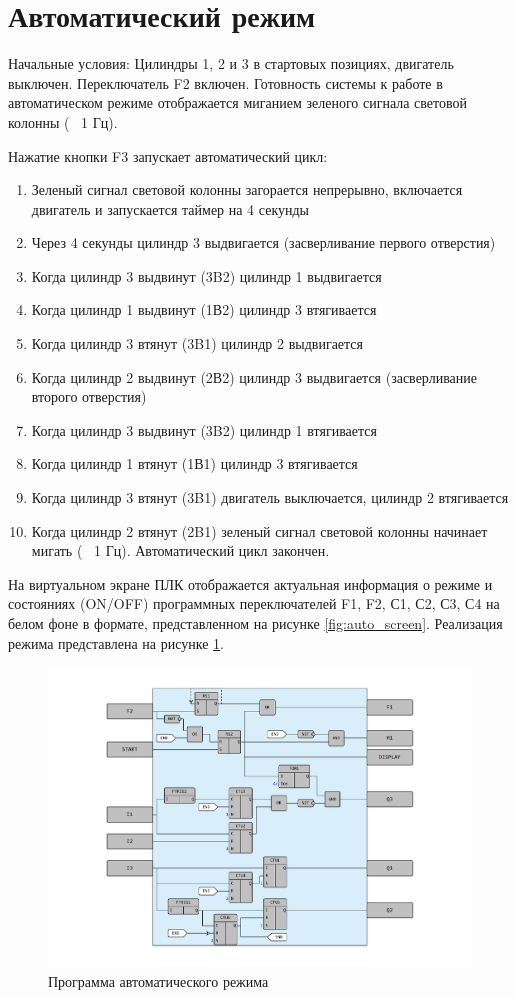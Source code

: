 \newpage
\section{Автоматический режим}
Начальные условия: Цилиндры 1, 2 и 3 в стартовых позициях, двигатель
выключен. Переключатель F2 включен. Готовность системы к работе в
автоматическом режиме отображается миганием зеленого сигнала световой
колонны (~ 1 Гц).

Нажатие кнопки F3 запускает автоматический цикл:
\begin{enumerate}
    \item Зеленый сигнал световой колонны загорается непрерывно, включается двигатель и запускается таймер на 4 секунды
    \item Через 4 секунды цилиндр 3 выдвигается (засверливание первого отверстия)
    \item Когда цилиндр 3 выдвинут (3B2) цилиндр 1 выдвигается
    \item Когда цилиндр 1 выдвинут (1В2) цилиндр 3 втягивается
    \item Когда цилиндр 3 втянут (3B1) цилиндр 2 выдвигается
    \item Когда цилиндр 2 выдвинут (2В2) цилиндр 3 выдвигается (засверливание второго отверстия)
    \item Когда цилиндр 3 выдвинут (3B2) цилиндр 1 втягивается
    \item Когда цилиндр 1 втянут (1В1) цилиндр 3 втягивается
    \item Когда цилиндр 3 втянут (3B1) двигатель выключается, цилиндр 2 втягивается
    \item Когда цилиндр 2 втянут (2B1) зеленый сигнал световой колонны начинает мигать (~ 1 Гц). Автоматический цикл закончен.
\end{enumerate}

На виртуальном экране ПЛК отображается актуальная информация о
режиме и состояниях (ON/OFF) программных переключателей F1, F2, С1, С2,
С3, С4 на белом фоне в формате, представленном на рисунке \ref{fig:auto_screen}.
Реализация режима представлена на рисунке \ref{fig:auto_mode}.

\begin{figure}[pt]
    \centering
    \includegraphics[width=1\textwidth]{fig/auto.pdf}
    \caption{Программа автоматического режима}
    \label{fig:auto_mode}
\end{figure}

